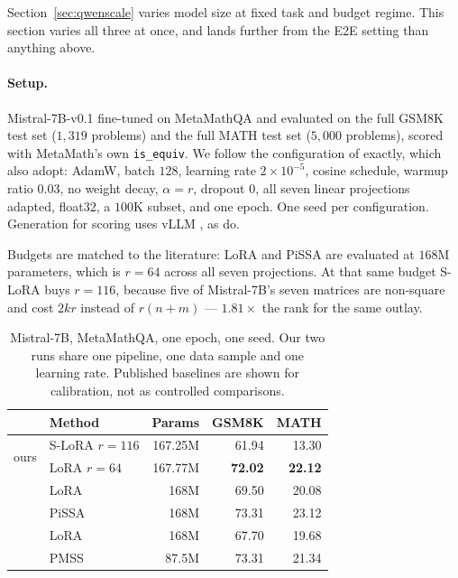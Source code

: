 \documentclass{article}
\theoremstyle{remark}
\begin{document}
Section~\ref{sec:qwenscale} varies model size at fixed task and budget regime.
This section varies all three at once, and lands further from the E2E setting
than anything above.

\paragraph{Setup.}
Mistral-7B-v0.1 \citep{jiang2023mistral} fine-tuned on MetaMathQA
\citep{yu2024metamath} and evaluated on the full GSM8K test set
\citep{cobbe2021gsm8k} ($1{,}319$ problems) and the full MATH test set
\citep{hendrycks2021math} ($5{,}000$ problems), scored with MetaMath's own
\texttt{is\_equiv}. We follow the configuration of \citet{meng2024pissa}
exactly, which \citet{wang2025pmss} also adopt: AdamW, batch $128$, learning
rate $2\times10^{-5}$, cosine schedule, warmup ratio $0.03$, no weight decay,
$\alpha=r$, dropout $0$, all seven linear projections adapted, float32, a
$100$K subset, and one epoch. One seed per configuration. Generation for
scoring uses vLLM \citep{kwon2023vllm}, as \citet{meng2024pissa} do.

Budgets are matched to the literature: LoRA and PiSSA are evaluated at $168$M
parameters, which is $r=64$ across all seven projections. At that same budget
S-LoRA buys $r=116$, because five of Mistral-7B's seven matrices are non-square
and cost $2kr$ instead of $r(n+m)$ --- $1.81\times$ the rank for the same
outlay.

\begin{table}[t]\centering
\caption{Mistral-7B, MetaMathQA, one epoch, one seed. Our two runs share one
pipeline, one data sample and one learning rate. Published baselines are shown
for calibration, not as controlled comparisons.}
\label{tab:math}
\begin{tabular}{llrrr}
\toprule
& Method & Params & GSM8K & MATH \\
\midrule
\multirow{2}{*}{ours}
& S-LoRA $r{=}116$ & 167.25M & 61.94 & 13.30 \\
& LoRA $r{=}64$    & 167.77M & \textbf{72.02} & \textbf{22.12} \\
\midrule
\multirow{2}{*}{\citet{meng2024pissa}}
& LoRA  & 168M & 69.50 & 20.08 \\
& PiSSA & 168M & 73.31 & 23.12 \\
\midrule
\multirow{2}{*}{\citet{wang2025pmss}}
& LoRA  & 168M & 67.70 & 19.68 \\
& PMSS  & 87.5M & 73.31 & 21.34 \\
\bottomrule
\end{tabular}
\end{table}
\end{document}
